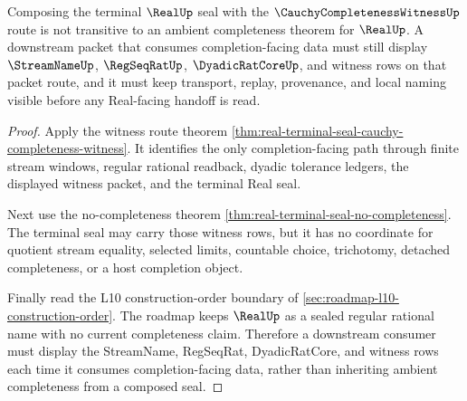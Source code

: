 \begin{theorem}
\label{thm:real-terminal-seal-witness-nontransitive-completeness}
Composing the terminal $\RealUp$ seal with the $\CauchyCompletenessWitnessUp$ route is not transitive to an ambient completeness theorem for $\RealUp$. A downstream packet that consumes completion-facing data must still display $\StreamNameUp$, $\RegSeqRatUp$, $\DyadicRatCoreUp$, and witness rows on that packet route, and it must keep transport, replay, provenance, and local naming visible before any Real-facing handoff is read.
\end{theorem}
\begin{proof}
Apply the witness route theorem \autoref{thm:real-terminal-seal-cauchy-completeness-witness}. It identifies the only completion-facing path through finite stream windows, regular rational readback, dyadic tolerance ledgers, the displayed witness packet, and the terminal Real seal.

Next use the no-completeness theorem \autoref{thm:real-terminal-seal-no-completeness}. The terminal seal may carry those witness rows, but it has no coordinate for quotient stream equality, selected limits, countable choice, trichotomy, detached completeness, or a host completion object.

Finally read the L10 construction-order boundary of \autoref{sec:roadmap-l10-construction-order}. The roadmap keeps $\RealUp$ as a sealed regular rational name with no current completeness claim. Therefore a downstream consumer must display the StreamName, RegSeqRat, DyadicRatCore, and witness rows each time it consumes completion-facing data, rather than inheriting ambient completeness from a composed seal.
\end{proof}
